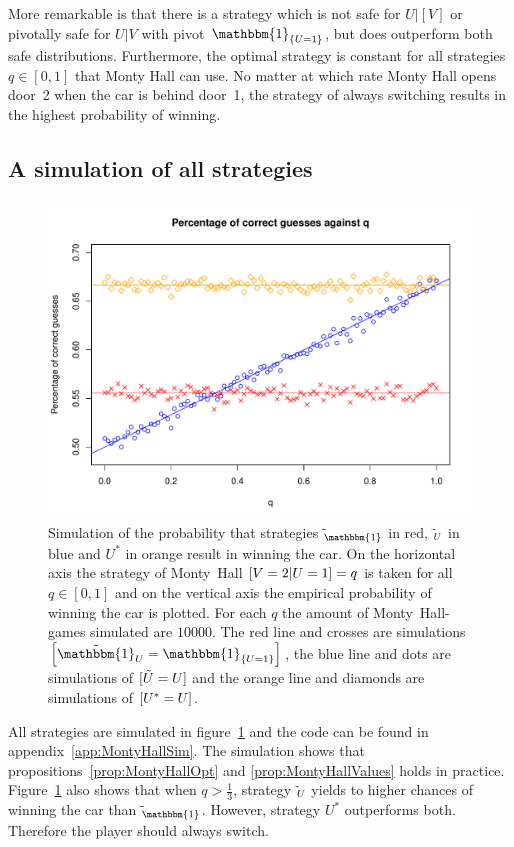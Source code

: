 \documentclass[twoside,a4paper]{article}
\theoremstyle{plain}
\theoremstyle{definition}
\theoremstyle{remark}
\numberwithin{equation}{section}
\let\P\relax
\DeclareMathOperator{\P}{\mathbb{P}}
\DeclareMathOperator{\1}{\mathbbm{1}}
\newcommand{\Psafe}{\tilde{\P}}
\newcommand{\Uonesafe}{\tilde{\1}_U}
\newcommand{\Usafe}{\tilde{U}}
\begin{document}
More remarkable is that there is a strategy which is not safe for $U|[V]$ or pivotally safe for $U|V$ with pivot $\1_{\{U=1\}}$, but does outperform both safe distributions. Furthermore, the optimal strategy is constant for all strategies $q\in[0,1]$ that Monty Hall can use. No matter at which rate Monty Hall opens door~2 when the car is behind door~1, the strategy of always switching results in the highest probability of winning.

\subsection{A simulation of all strategies}

\begin{figure}
\includegraphics[width=\linewidth]{Figures/MontyHall.pdf}
\caption{Simulation of the probability that strategies $\Psafe_{\1}$ in red, $\Psafe_U$ in blue and $U^*$ in orange result in winning the car. On the horizontal axis the strategy of Monty~Hall $\P[V=2|U=1]=q$ is taken for all $q\in[0,1]$ and on the vertical axis the empirical probability of winning the car is plotted. For each $q$ the amount of Monty~Hall-games simulated are $10000$. The red line and crosses are simulations $\P\left[\Uonesafe=\1_{\{U=1\}}\right]$, the blue line and dots are simulations of $\P[\Usafe=U]$ and the orange line and diamonds are simulations of $\P[U^*=U]$.}
\label{fig:MontyHall}
\end{figure}

All strategies are simulated in figure~\ref{fig:MontyHall} and the code can be found in appendix~\ref{app:MontyHallSim}. The simulation shows that propositions~\ref{prop:MontyHallOpt} and \ref{prop:MontyHallValues} holds in practice. Figure~\ref{fig:MontyHall} also shows that when $q>\frac{1}{3}$, strategy $\Psafe_U$ yields to higher chances of winning the car than $\Psafe_{\1}$. However, strategy $U^*$ outperforms both. Therefore the player should always switch.
\end{document}

